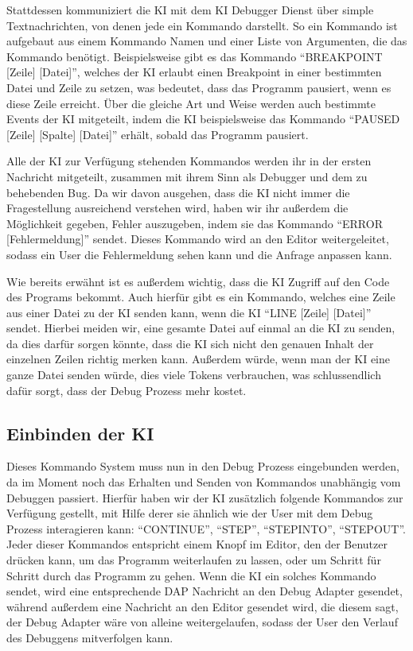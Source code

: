 \documentclass[a4paper,12pt,ngerman]{scrartcl}
\begin{document}
Stattdessen kommuniziert die KI mit dem KI Debugger Dienst über simple Textnachrichten, von denen jede ein Kommando darstellt. So ein Kommando ist aufgebaut aus einem Kommando Namen und einer Liste von Argumenten, die das Kommando benötigt. Beispielsweise gibt es das Kommando ``BREAKPOINT [Zeile] [Datei]'', welches der KI erlaubt einen Breakpoint in einer bestimmten Datei und Zeile zu setzen, was bedeutet, dass das Programm pausiert, wenn es diese Zeile erreicht. Über die gleiche Art und Weise werden auch bestimmte Events der KI mitgeteilt, indem die KI beispielsweise das Kommando ``PAUSED [Zeile] [Spalte] [Datei]'' erhält, sobald das Programm pausiert.

Alle der KI zur Verfügung stehenden Kommandos werden ihr in der ersten Nachricht mitgeteilt, zusammen mit ihrem Sinn als Debugger und dem zu behebenden Bug. Da wir davon ausgehen, dass die KI nicht immer die Fragestellung ausreichend verstehen wird, haben wir ihr außerdem die Möglichkeit gegeben, Fehler auszugeben, indem sie das Kommando ``ERROR [Fehlermeldung]'' sendet. Dieses Kommando wird an den Editor weitergeleitet, sodass ein User die Fehlermeldung sehen kann und die Anfrage anpassen kann.

Wie bereits erwähnt ist es außerdem wichtig, dass die KI Zugriff auf den Code des Programs bekommt. Auch hierfür gibt es ein Kommando, welches eine Zeile aus einer Datei zu der KI senden kann, wenn die KI ``LINE [Zeile] [Datei]'' sendet. Hierbei meiden wir, eine gesamte Datei auf einmal an die KI zu senden, da dies darfür sorgen könnte, dass die KI sich nicht den genauen Inhalt der einzelnen Zeilen richtig merken kann. Außerdem würde, wenn man der KI eine ganze Datei senden würde, dies viele Tokens verbrauchen, was schlussendlich dafür sorgt, dass der Debug Prozess mehr kostet.

\subsection{Einbinden der KI}

Dieses Kommando System muss nun in den Debug Prozess eingebunden werden, da im Moment noch das Erhalten und Senden von Kommandos unabhängig vom Debuggen passiert. Hierfür haben wir der KI zusätzlich folgende Kommandos zur Verfügung gestellt, mit Hilfe derer sie ähnlich wie der User mit dem Debug Prozess interagieren kann: ``CONTINUE'', ``STEP'', ``STEPINTO'', ``STEPOUT''. Jeder dieser Kommandos entspricht einem Knopf im Editor, den der Benutzer drücken kann, um das Programm weiterlaufen zu lassen, oder um Schritt für Schritt durch das Programm zu gehen. Wenn die KI ein solches Kommando sendet, wird eine entsprechende DAP Nachricht an den Debug Adapter gesendet, während außerdem eine Nachricht an den Editor gesendet wird, die diesem sagt, der Debug Adapter wäre von alleine weitergelaufen, sodass der User den Verlauf des Debuggens mitverfolgen kann.
\end{document}
